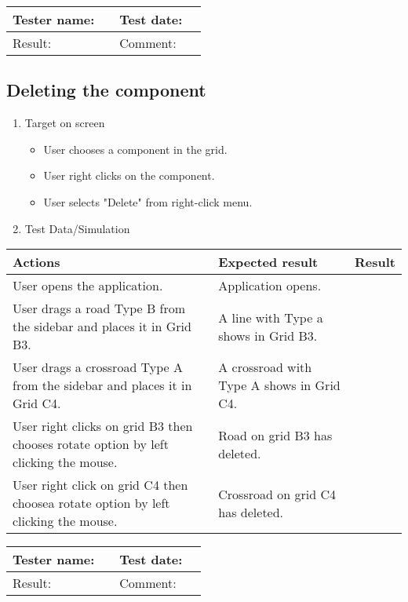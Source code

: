 		


\begin{tabularx}{\textwidth}{|p{3cm}X|p{3cm}X|}\hline
	Tester name: &  & Test date: & \\\hline
	Result: &   \pass & Comment: & \\\hline
\end{tabularx}

\newpage

\subsection{Deleting the component}

\begin{enumerate}
	
	\item Target on screen
	\begin{itemize}
		\item User chooses a component in the grid.
		\item User right clicks on the component.
		\item User selects "Delete" from right-click menu.
	\end{itemize}
	\item Test Data/Simulation
\end{enumerate}	
	\begin{tabularx}{\textwidth}{|X|X|p{2.5cm}|}\hline
		Actions & Expected result & Result \\\hline
		User opens the application.& Application opens. &  \pass \\\hline
		User drags a road Type B from the sidebar and places it in Grid B3. & A line with Type a shows in Grid B3. & \pass \\\hline
		User drags a crossroad Type A from the sidebar and places it in Grid C4. & A crossroad with Type A shows in Grid C4. & \pass \\\hline
		User right clicks on grid B3 then chooses rotate option by left clicking the mouse.  & Road on grid B3 has deleted.  & \pass \\\hline
		User right click on grid C4 then choosea rotate option by left clicking the mouse. & Crossroad on grid C4 has deleted. & \pass \\\hline
	\end{tabularx}
	


\begin{tabularx}{\textwidth}{|p{3cm}X|p{3cm}X|}\hline
	Tester name: &  & Test date: & \\\hline
	Result: &   \pass & Comment: & \\\hline
\end{tabularx}

